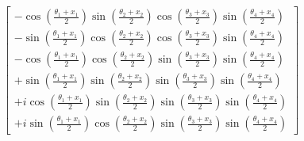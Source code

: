 \documentclass[12pt]{article}
\numberwithin{equation}{section}  %
\theoremstyle{definition}
\theoremstyle{plain}
\theoremstyle{remark}
\begin{document}
\begin{equation}
\begin{bmatrix}
-\cos\left(\frac{\theta_1+x_1}{2}\right)
\sin\left(\frac{\theta_2+x_2}{2}\right)
\cos\left(\frac{\theta_3+x_3}{2}\right)
\sin\left(\frac{\theta_4+x_4}{2}\right)
\\[6pt]

-\sin\left(\frac{\theta_1+x_1}{2}\right)
\cos\left(\frac{\theta_2+x_2}{2}\right)
\cos\left(\frac{\theta_3+x_3}{2}\right)
\sin\left(\frac{\theta_4+x_4}{2}\right)
\\[6pt]

-\cos\left(\frac{\theta_1+x_1}{2}\right)
\cos\left(\frac{\theta_2+x_2}{2}\right)
\sin\left(\frac{\theta_3+x_3}{2}\right)
\sin\left(\frac{\theta_4+x_4}{2}\right)
\\[6pt]

+\sin\left(\frac{\theta_1+x_1}{2}\right)
\sin\left(\frac{\theta_2+x_2}{2}\right)
\sin\left(\frac{\theta_3+x_3}{2}\right)
\sin\left(\frac{\theta_4+x_4}{2}\right)
\\[6pt]

+i\cos\left(\frac{\theta_1+x_1}{2}\right)
\sin\left(\frac{\theta_2+x_2}{2}\right)
\sin\left(\frac{\theta_3+x_3}{2}\right)
\sin\left(\frac{\theta_4+x_4}{2}\right)
\\[6pt]

+i\sin\left(\frac{\theta_1+x_1}{2}\right)
\cos\left(\frac{\theta_2+x_2}{2}\right)
\sin\left(\frac{\theta_3+x_3}{2}\right)
\sin\left(\frac{\theta_4+x_4}{2}\right)
\end{bmatrix}
\label{eq:firstcnot}
\end{equation}
\end{document}
